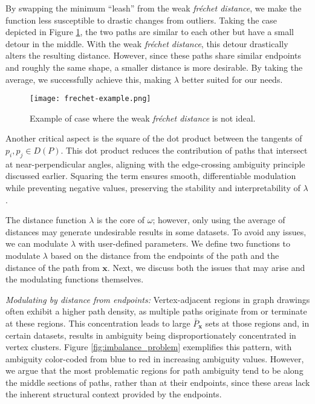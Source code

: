 By swapping the minimum ``leash'' from the weak \emph{fr\'echet distance}, we make the function less susceptible to drastic changes from outliers. Taking the case depicted in Figure \ref{fig:frechet_example}, the two paths are similar to each other but have a small detour in the middle. With the weak \emph{fr\'echet distance}, this detour drastically alters the resulting distance. However, since these paths share similar endpoints and roughly the same shape, a smaller distance is more desirable. By taking the average, we successfully achieve this, making $\lambda$ better suited for our needs.

\begin{figure}[ht]
\centering
\texttt{[image: frechet-example.png]}
\caption{Example of case where the weak \emph{fr\'echet distance} is not ideal.}
\label{fig:frechet_example}
\end{figure}

Another critical aspect is the square of the dot product between the tangents of $p_i, p_j \in D(P)$. This dot product reduces the contribution of paths that intersect at near-perpendicular angles, aligning with the edge-crossing ambiguity principle discussed earlier. Squaring the term ensures smooth, differentiable modulation while preventing negative values, preserving the stability and interpretability of $\lambda$.

The distance function $\lambda$ is the core of $\omega$; however, only using the average of distances may generate undesirable results in some datasets. To avoid any issues, we can modulate $\lambda$ with user-defined parameters. We define two functions to modulate $\lambda$ based on the distance from the endpoints of the path and the distance of the path from $\mathbf{x}$. Next, we discuss both the issues that may arise and the modulating functions themselves.


\emph{Modulating by distance from endpoints:}
Vertex-adjacent regions in graph drawings often exhibit a higher path density, as multiple paths originate from or terminate at these regions. This concentration leads to large $\bar{P}_{\mathbf{x}}$ sets at those regions and, in certain datasets, results in ambiguity being disproportionately concentrated in vertex clusters. Figure \ref{fig:imbalance_problem} exemplifies this pattern, with ambiguity color-coded from blue to red in increasing ambiguity values. However, we argue that the most problematic regions for path ambiguity tend to be along the middle sections of paths, rather than at their endpoints, since these areas lack the inherent structural context provided by the endpoints.

